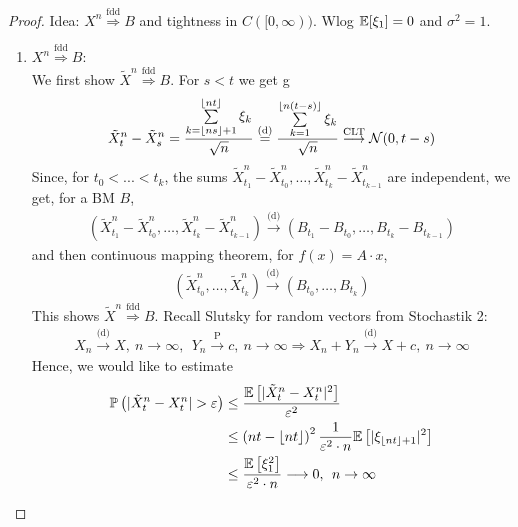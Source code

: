 \begin{proof}
	Idea: $X^n \overset{\text{fdd}}{\Rightarrow} B$ and tightness in $C([0,\infty))$. Wlog $\mathbb{E}[\xi_1] = 0$ and $\sigma^2 = 1$.
	\begin{enumerate}
		\item
			$X^n \overset{\text{fdd}}{\Rightarrow} B$:\\
			We first show $\tilde{X}^n \overset{\text{fdd}}{\Rightarrow} B$. For $s<t$ we get g
			\begin{align*}
				\tilde{X}_t^n - \tilde{X}_s^n = \frac{\sum\limits_{k= \lfloor ns \rfloor + 1 }^{\lfloor nt \rfloor}\xi_k}{\sqrt{n}} \overset{\text{(d)}}{=} \frac{\sum\limits_{k= 1}^{\lfloor n(t-s) \rfloor}\xi_k}{\sqrt{n}} \overset{\text{CLT}}{\longrightarrow} \mathcal{N}(0,t-s)
			\end{align*}
			Since, for $t_0 < ... < t_k$, the sums $\tilde{X}_{t_1}^n - \tilde{X}_{t_0}^n, \dots , \tilde{X}_{t_k}^n - \tilde{X}_{t_{k-1}}^n$ are independent, we get, for a BM $B$,
			\begin{align*}
				\left(\tilde{X}_{t_1}^n - \tilde{X}_{t_0}^n, \dots , \tilde{X}_{t_k}^n - \tilde{X}_{t_{k-1}}^n \right) \overset{\text{(d)}}{\longrightarrow} \left( B_{t_1}-B_{t_0}, \dots , B_{t_k} - B_{t_{k-1}}\right)
			\end{align*}
			and then continuous mapping theorem, for $f(x) = A \cdot x$,
			\begin{align*}
				\left(\tilde{X}_{t_0}^n,\dots , \tilde{X}_{t_k}^n\right) \overset{\text{(d)}}{\longrightarrow} \left( B_{t_0},\dots , B_{t_k}\right)
			\end{align*}
			This shows $\tilde{X}^n \overset{\text{fdd}}{\Rightarrow} B$. Recall Slutsky for random vectors from Stochastik 2:
			\begin{align*}
				X_n \overset{\text{(d)}}{\to} X, \: n\to\infty, \:\: Y_n \overset{\text{P}}{\to} c, \: n\to\infty \Rightarrow X_n + Y_n \overset{\text{(d)}}{\to} X + c, \: n\to\infty
			\end{align*}
			Hence, we would like to estimate
			\begin{align*}
				\mathbb{P}\left(\lvert\tilde{X}_t^n - X_t^n \rvert > \varepsilon \right) &\leq \frac{\E\left[ \lvert\tilde{X}_t^n - X_t^n \rvert^2\right]}{\varepsilon^2} \\
				&\leq \left( nt - \lfloor nt \rfloor \right)^2 \frac{1}{\varepsilon^2\cdot n} \E \left[ \lvert \xi_{\lfloor nt \rfloor + 1}\rvert^2 \right] \\
				&\leq \frac{\E\left[ \xi_1^2\right]}{\varepsilon^2 \cdot n} \longrightarrow 0, \:\: n\to\infty

\end{align*}
\end{enumerate}
\end{proof}
